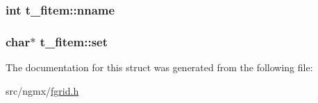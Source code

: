 \hypertarget{structt__fitem_aeefc9ba4d6925ebd9c6f8a6ed343d3d2}{
\subsubsection[{nname}]{\setlength{\rightskip}{0pt plus 5cm}int {\bf t\-\_\-fitem\-::nname}}}\label{structt__fitem_aeefc9ba4d6925ebd9c6f8a6ed343d3d2}
\hypertarget{structt__fitem_a2a9115dd516b2b813e450f3af7c193d1}{
\subsubsection[{set}]{\setlength{\rightskip}{0pt plus 5cm}char$\ast$ {\bf t\-\_\-fitem\-::set}}}\label{structt__fitem_a2a9115dd516b2b813e450f3af7c193d1}


\-The documentation for this struct was generated from the following file\-:\begin{DoxyCompactItemize}
\item 
src/ngmx/\hyperlink{fgrid_8h}{fgrid.\-h}\end{DoxyCompactItemize}
